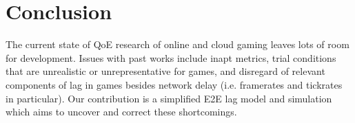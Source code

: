 \section{Conclusion}
\label{sec:conclusion}

The current state of \gls{QoE} research of online and cloud gaming leaves lots of room for development. Issues with past works include inapt metrics, trial conditions that are unrealistic or unrepresentative for games, and disregard of relevant components of lag in games besides network delay (i.e. framerates and tickrates in particular). Our contribution is a simplified \gls{E2E} lag model and simulation which aims to uncover and correct these shortcomings.




